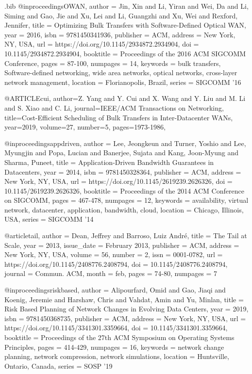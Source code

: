 \documentclass[sigconf]{acmart}
\begin{document}
\begin{filecontents}{\jobname.bib}
@inproceedings{OWAN, author = {Jin, Xin and Li, Yiran and Wei, Da and Li, Siming and Gao, Jie and Xu, Lei and Li, Guangzhi and Xu, Wei and Rexford, Jennifer}, title = {Optimizing Bulk Transfers with Software-Defined Optical WAN}, year = {2016}, isbn = {9781450341936}, publisher = {ACM}, address = {New York, NY, USA}, url = {https://doi.org/10.1145/2934872.2934904}, doi = {10.1145/2934872.2934904}, booktitle = {Proceedings of the 2016 ACM SIGCOMM Conference}, pages = {87-100}, numpages = {14}, keywords = {bulk transfers, Software-defined networking, wide area networks, optical networks, cross-layer network management}, location = {Florianopolis, Brazil}, series = {SIGCOMM '16} }

@ARTICLE{cui,  author={Z. {Yang} and Y. {Cui} and X. {Wang} and Y. {Liu} and M. {Li} and S. {Xiao} and C. {Li}},  journal={IEEE/ACM Transactions on Networking},   title={Cost-Efficient Scheduling of Bulk Transfers in Inter-Datacenter WANs},   year={2019},  volume={27},  number={5},  pages={1973-1986},}

@inproceedings{appdriven, author = {Lee, Jeongkeun and Turner, Yoshio and Lee, Myungjin and Popa, Lucian and Banerjee, Sujata and Kang, Joon-Myung and Sharma, Puneet}, title = {Application-Driven Bandwidth Guarantees in Datacenters}, year = {2014}, isbn = {9781450328364}, publisher = {ACM}, address = {New York, NY, USA}, url = {https://doi.org/10.1145/2619239.2626326}, doi = {10.1145/2619239.2626326}, booktitle = {Proceedings of the 2014 ACM Conference on SIGCOMM}, pages = {467-478}, numpages = {12}, keywords = {availability, virtual network, datacenter, application, bandwidth, cloud}, location = {Chicago, Illinois, USA}, series = {SIGCOMM '14} }

@article{tail, author = {Dean, Jeffrey and Barroso, Luiz Andr\'{e}}, title = {The Tail at Scale}, year = {2013}, issue_date = {February 2013}, publisher = {ACM}, address = {New York, NY, USA}, volume = {56}, number = {2}, issn = {0001-0782}, url = {https://doi.org/10.1145/2408776.2408794}, doi = {10.1145/2408776.2408794}, journal = {Commun. ACM}, month = feb, pages = {74-80}, numpages = {7} }


@inproceedings{riskbased, author = {Alipourfard, Omid and Gao, Jiaqi and Koenig, Jeremie and Harshaw, Chris and Vahdat, Amin and Yu, Minlan}, title = {Risk Based Planning of Network Changes in Evolving Data Centers}, year = {2019}, isbn = {9781450368735}, publisher = {ACM}, address = {New York, NY, USA}, url = {https://doi.org/10.1145/3341301.3359664}, doi = {10.1145/3341301.3359664}, booktitle = {Proceedings of the 27th ACM Symposium on Operating Systems Principles}, pages = {414-429}, numpages = {16}, keywords = {network change planning, network compression, network simulations}, location = {Huntsville, Ontario, Canada}, series = {SOSP '19} }


\end{filecontents}
\end{document}
